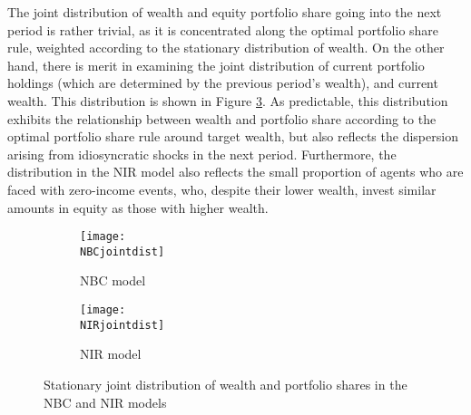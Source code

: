 The joint distribution of wealth and equity portfolio share going into the next period is rather trivial, as it is concentrated along the optimal portfolio share rule, weighted according to the stationary distribution of wealth. On the other hand, there is merit in examining the joint distribution of current portfolio holdings (which are determined by the previous period's wealth), and current wealth. This distribution is shown in Figure \ref{fig:jointdist}. As predictable, this distribution exhibits the relationship between wealth and portfolio share according to the optimal portfolio share rule around target wealth, but also reflects the dispersion arising from idiosyncratic shocks in the next period. Furthermore, the distribution in the NIR model also reflects the small proportion of agents who are faced with zero-income events, who, despite their lower wealth, invest similar amounts in equity as those with higher wealth.
\begin{figure}[h]
    \centering
    \begin{subfigure}{0.49\textwidth}
        \centering
        \texttt{[image: \\NBCjointdist]}
        \caption{NBC model}
        \label{subfig:NBCjointdist}
    \end{subfigure}
    \begin{subfigure}{0.49\textwidth}
        \centering
        \texttt{[image: \\NIRjointdist]}
        \caption{NIR model}
        \label{subfig:NIRjointdist}
    \end{subfigure}
    \caption{Stationary joint distribution of wealth and portfolio shares in the NBC and NIR models}
    \label{fig:jointdist}
\end{figure}